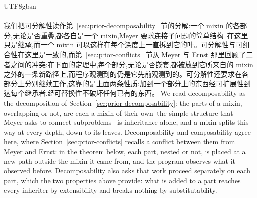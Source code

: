 \begin{CJK*}{UTF8}{gbsn}
\paragraph{}
\ifPaperChinese
我们把可分解性读作第~\ref{sec:prior-decomposability}~节的分解:一个 mixin 的各部分,无论是否重叠,都各自是一个 mixin,Meyer 要求连接子问题的简单结构~\cite[第~40~页]{meyer1997-object-oriented-software-construction}在这里只是继承,而一个 mixin 可以这样在每个深度上一直拆到它的叶。可分解性与可组合性在这里是一致的,而第~\ref{sec:prior-conflicts}~节从 Meyer 与 Ernst 那里回顾了二者之间的冲突:在下面的定理中,每个部分,无论是否嵌套,都被放到它所来自的 mixin 之外的一条新路径上,而程序观测到的仍是它先前观测到的。可分解性还要求在各部分上分别继续工作,这靠的是上面两条性质:加到一个部分上的东西经可扩展性到达每个继承者,经可替换性不破坏任何已有的东西。
\else
We read decomposability as the decomposition of Section~\ref{sec:prior-decomposability}: the parts of a mixin, overlapping or not, are each a mixin of
their own, the simple structure that Meyer asks to connect
subproblems~\cite[p.~40]{meyer1997-object-oriented-software-construction} is inheritance alone, and a
mixin splits this way at every depth, down to its leaves.
Decomposability and composability agree here, where Section~\ref{sec:prior-conflicts} recalls a conflict
between them from Meyer and Ernst: in the theorem below, each part, nested or not, is placed at a new
path outside the mixin it came from, and the program observes what it observed before. Decomposability also asks that work proceed separately on each part, which the two properties
above provide: what is added to a part reaches every inheriter by extensibility and breaks nothing by
substitutability.
\fi


\end{CJK*}
